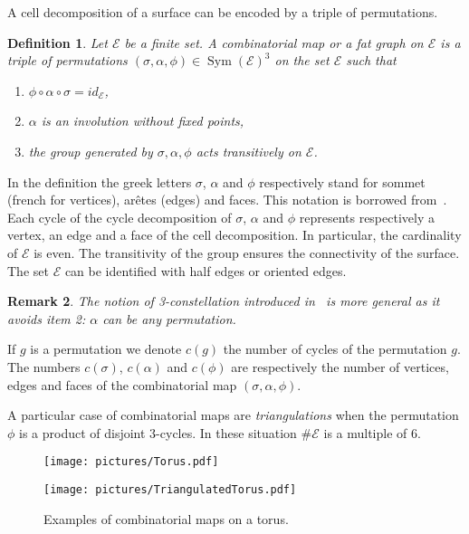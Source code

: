 \documentclass[a4paper,12pt]{article}
\def\cE{\mathcal{E}}
\def\Sym{\operatorname{Sym}}
\newtheorem{definition}{Definition}
\newtheorem{remark}[definition]{Remark}
\begin{document}
A cell decomposition of a surface can be encoded by a triple of
permutations.
\begin{definition}
Let $\cE$ be a finite set.
A \emph{combinatorial map} or a \emph{fat graph} on $\cE$ is a triple
of permutations $(\sigma, \alpha, \phi) \in \Sym(\cE)^3$ on
the set $\cE$ such that
\begin{enumerate}
\item $\phi \circ \alpha \circ \sigma = id_\cE$,
\item $\alpha$ is an involution without fixed points,
\item the group generated by $\sigma, \alpha, \phi$ acts transitively on $\cE$.
\end{enumerate}
\end{definition}
In the definition the greek letters  $\sigma$, $\alpha$ and $\phi$ respectively stand
for sommet (french for vertices), ar\^etes (edges) and faces. This notation is borrowed
from~\cite{LandoZvonkin}. Each cycle of the cycle
decomposition of $\sigma$, $\alpha$ and $\phi$ represents respectively a vertex, an edge
and a face of the cell decomposition. In particular, the cardinality of $\cE$
is even. The transitivity of the group ensures the connectivity of the surface.
The set $\cE$ can be identified with half edges or oriented edges.

\begin{remark}
The notion of 3-constellation introduced in~\cite{LandoZvonkin} is more general as it
avoids item 2: $\alpha$ can be any permutation.
\end{remark}

If $g$ is a permutation we denote $c(g)$ the number of cycles of the permutation $g$.
The numbers $c(\sigma)$, $c(\alpha)$ and $c(\phi)$ are respectively the number of vertices,
edges and faces of the combinatorial map $(\sigma, \alpha, \phi)$.

A particular case of combinatorial maps are \emph{triangulations}
when the permutation $\phi$ is a product of disjoint 3-cycles.
In these situation $\# \cE$ is a multiple of $6$.

\begin{figure}[!ht]
\begin{minipage}{0.4\textwidth}
\begin{center}
\texttt{[image: pictures/Torus.pdf]}
\end{center}
\end{minipage}
\hspace{0.1\textwidth}
\begin{minipage}{0.4\textwidth}
\begin{center}
\texttt{[image: pictures/TriangulatedTorus.pdf]}
\end{center}
\end{minipage}
\caption{Examples of combinatorial maps on a torus.}
\label{fig:CombinatorialMapTori}
\end{figure}
\end{document}
